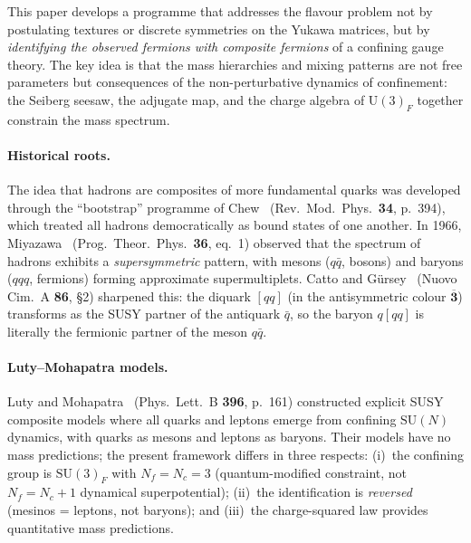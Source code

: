 \documentclass[12pt,a4paper]{article}
\newcommand{\SU}{\mathrm{SU}}
\newcommand{\UU}{\mathrm{U}}
\newcommand{\Nf}{N_{\!f}}
\newcommand{\Nc}{N_{\!c}}
\begin{document}
This paper develops a programme that addresses the flavour
problem not by postulating textures or discrete symmetries on the
Yukawa matrices, but by \emph{identifying the observed fermions
with composite fermions} of a confining gauge theory.
The key idea is that the mass hierarchies and mixing patterns are
not free parameters but consequences of the non-perturbative
dynamics of confinement: the Seiberg seesaw, the adjugate map,
and the charge algebra of $\UU(3)_F$ together constrain the
mass spectrum.

\paragraph{Historical roots.}
The idea that hadrons are composites of more fundamental quarks
was developed through the ``bootstrap'' programme of
Chew~\cite{Chew:1962} (Rev.\ Mod.\ Phys.\ \textbf{34}, p.~394),
which treated all hadrons democratically as bound states of one
another.
In 1966, Miyazawa~\cite{Miyazawa:1966} (Prog.\ Theor.\ Phys.\
\textbf{36}, eq.~1) observed that the spectrum of hadrons
exhibits a \emph{supersymmetric} pattern, with mesons
($q\bar{q}$, bosons) and baryons ($qqq$, fermions) forming
approximate supermultiplets.
Catto and G\"ursey~\cite{CattoGursey:1985} (Nuovo Cim.\ A
\textbf{86}, \S2) sharpened this: the diquark $[qq]$ (in the
antisymmetric colour $\overline{\mathbf{3}}$) transforms as
the SUSY partner of the antiquark $\bar{q}$, so the baryon
$q[qq]$ is literally the fermionic partner of the meson
$q\bar{q}$.

\paragraph{Luty--Mohapatra models.}
Luty and Mohapatra~\cite{LutyMohapatra:1997} (Phys.\ Lett.\ B
\textbf{396}, p.~161) constructed explicit SUSY composite models
where all quarks and leptons emerge from confining $\SU(N)$
dynamics, with quarks as mesons and leptons as baryons.
Their models have no mass predictions; the present framework
differs in three respects: (i)~the confining group is
$\SU(3)_F$ with $\Nf = \Nc = 3$ (quantum-modified constraint,
not $\Nf = \Nc + 1$ dynamical superpotential); (ii)~the
identification is \emph{reversed} (mesinos = leptons, not
baryons); and (iii)~the charge-squared law provides
quantitative mass predictions.
\end{document}

